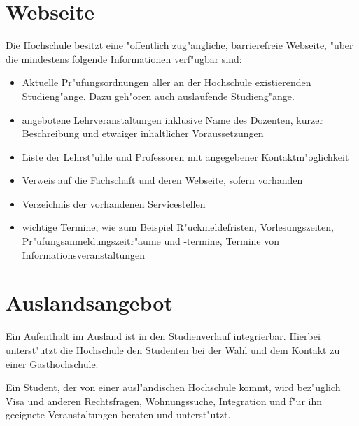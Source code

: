\section{Webseite}

Die Hochschule besitzt eine "offentlich zug"angliche, barrierefreie Webseite, "uber die mindestens folgende Informationen verf"ugbar sind:
\begin{itemize}
\item Aktuelle Pr"ufungsordnungen aller an der Hochschule existierenden Studieng"ange. Dazu geh"oren auch auslaufende Studieng"ange.

\item angebotene Lehrveranstaltungen inklusive Name des Dozenten, kurzer Beschreibung und etwaiger inhaltlicher Voraussetzungen

\item Liste der Lehrst"uhle und Professoren mit angegebener Kontaktm"oglichkeit

\item Verweis auf die Fachschaft und deren Webseite, sofern vorhanden

\item Verzeichnis der vorhandenen Servicestellen

\item wichtige Termine, wie zum Beispiel R"uckmeldefristen, Vorlesungszeiten, Pr"ufungsanmeldungszeitr"aume und -termine, Termine von Informationsveranstaltungen
\end{itemize}


\section{Auslandsangebot}

Ein Aufenthalt im Ausland ist in den Studienverlauf integrierbar.  Hierbei
unterst"utzt die Hochschule den Studenten bei der Wahl und dem Kontakt zu einer Gasthochschule.

Ein Student, der von einer ausl"andischen Hochschule kommt, wird bez"uglich
Visa und anderen Rechtsfragen, Wohnungssuche, Integration und f"ur ihn geeignete Veranstaltungen
beraten und unterst"utzt.
